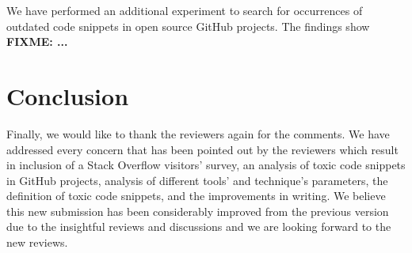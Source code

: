 \documentclass[a4paper,twoside,10pt]{reviewresponse}
\newcommand\FIXME[1]{{\color{red}\textbf{FIXME: #1}}}
\begin{document}
We have performed an additional experiment to search for occurrences of outdated code snippets in open source GitHub projects. The findings show \FIXME{...}

\vspace{1cm}

\section{Conclusion}
Finally, we would like to thank the reviewers again for the comments.
We have addressed every concern that has been pointed out by the reviewers which result in inclusion of a Stack Overflow visitors' survey, an analysis of toxic code snippets in GitHub projects, analysis of different tools' and technique's parameters, the definition of toxic code snippets, and the improvements in writing.
We believe this new submission has been considerably improved from the previous version due to the insightful reviews and discussions and we are looking forward to the new reviews.

%


\end{document}

